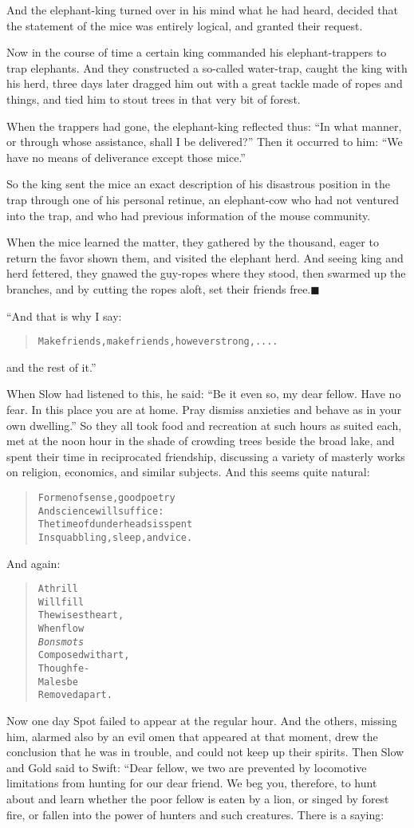\documentclass[article, twoside, 14pt]{memoir}
\newcommand{\qed}{\hfill \ensuremath{\blacksquare}}
\renewenvironment{verbatim}{%
\begin{quote}%
\vskip -10pt%
\begin{alltt}\normalfont\large}{\end{alltt}%
\end{quote}%
\vskip -10pt
} %
\begin{document}
And the elephant-king turned over in his mind what he had heard,
decided that the statement of the mice was entirely logical, and
granted their request.

Now in the course of time a certain king commanded his
elephant-trappers to trap elephants. And they constructed a
so-called water-trap, caught the king with his herd, three days
later dragged him out with a great tackle made of ropes and things,
and tied him to stout trees in that very bit of forest.

When the trappers had gone, the elephant-king reflected thus:
``In what manner, or through whose assistance, shall I be delivered?''
Then it occurred to him:
``We have no means of deliverance except those mice.''

So the king sent the mice an exact description of his disastrous
position in the trap through one of his personal retinue, an
elephant-cow who had not ventured into the trap, and who had
previous information of the mouse community.

When the mice learned the matter, they gathered by the thousand,
eager to return the favor shown them, and visited the elephant
herd. And seeing king and herd fettered, they gnawed the guy-ropes
where they stood, then swarmed up the branches, and by cutting the
ropes aloft, set their friends free.\hyperref[s44]{\qed}

“And that is why I say:

\begin{verbatim}
Make friends, make friends, however strong, ....
\end{verbatim}
and the rest of it.”

When Slow had listened to this, he said:
``Be it even so, my dear fellow. Have no fear. In this place you are at home. Pray dismiss anxieties and behave as in your own dwelling.''
So they all took food and recreation at such hours as suited each,
met at the noon hour in the shade of crowding trees beside the
broad lake, and spent their time in reciprocated friendship,
discussing a variety of masterly works on religion, economics, and
similar subjects. And this seems quite natural:

\begin{verbatim}
For men of sense, good poetry
    And science will suffice:
The time of dunderheads is spent
    In squabbling, sleep, and vice.
\end{verbatim}
And again:

\begin{verbatim}
A thrill
Will fill
    The wisest heart,
When flow
\emph{Bons mots}
    Composed with art,
Though fe-
Males be
    Removed apart.
\end{verbatim}
Now one day Spot failed to appear at the regular hour. And the
others, missing him, alarmed also by an evil omen that appeared at
that moment, drew the conclusion that he was in trouble, and could
not keep up their spirits. Then Slow and Gold said to Swift: “Dear
fellow, we two are prevented by locomotive limitations from hunting
for our dear friend. We beg you, therefore, to hunt about and learn
whether the poor fellow is eaten by a lion, or singed by forest
fire, or fallen into the power of hunters and such creatures. There
is a saying:
\end{document}
